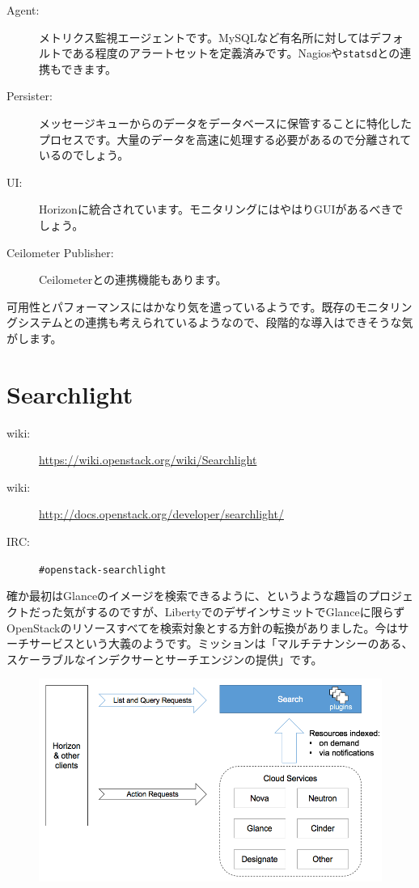 \begin{description}
	\item[Agent:] メトリクス監視エージェントです。MySQLなど有名所に対してはデフォルトである程度のアラートセットを定義済みです。Nagiosや\verb|statsd|との連携もできます。
	\item[Persister:] メッセージキューからのデータをデータベースに保管することに特化したプロセスです。大量のデータを高速に処理する必要があるので分離されているのでしょう。
	\item[UI:] Horizonに統合されています。モニタリングにはやはりGUIがあるべきでしょう。
	\item[Ceilometer Publisher:] Ceilometerとの連携機能もあります。
\end{description}

可用性とパフォーマンスにはかなり気を遣っているようです。既存のモニタリングシステムとの連携も考えられているようなので、段階的な導入はできそうな気がします。

\section{Searchlight}

\begin{description}
	\item[wiki:] \url{https://wiki.openstack.org/wiki/Searchlight}
	\item[wiki:] \url{http://docs.openstack.org/developer/searchlight/}
	\item[IRC:] \verb|#openstack-searchlight|
\end{description}

確か最初はGlanceのイメージを検索できるように、というような趣旨のプロジェクトだった気がするのですが、LibertyでのデザインサミットでGlanceに限らずOpenStackのリソースすべてを検索対象とする方針の転換がありました。今はサーチサービスという大義のようです。ミッションは「マルチテナンシーのある、スケーラブルなインデクサーとサーチエンジンの提供」です。

\begin{figure}
	\includegraphics[width=\textwidth]{img/Searchlight-Concept-1.png}
\end{figure}

